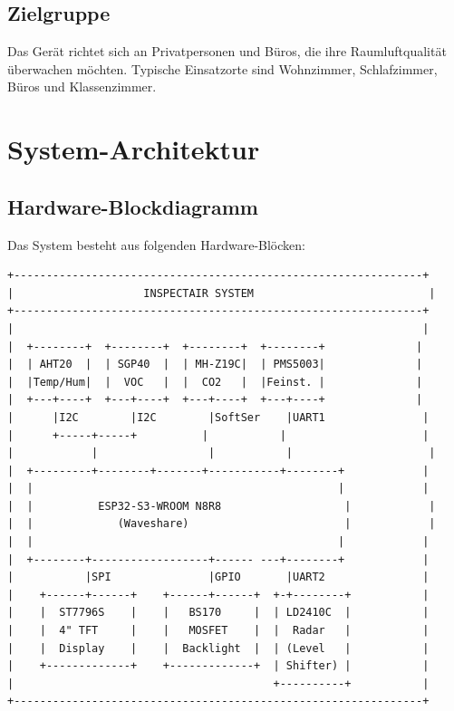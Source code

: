 \documentclass[a4paper,11pt]{article}
\begin{document}
\subsection{Zielgruppe}
Das Gerät richtet sich an Privatpersonen und Büros, die ihre Raumluftqualität überwachen möchten. Typische Einsatzorte sind Wohnzimmer, Schlafzimmer, Büros und Klassenzimmer.

\section{System-Architektur}

\subsection{Hardware-Blockdiagramm}

Das System besteht aus folgenden Hardware-Blöcken:

\begin{lstlisting}[language={},basicstyle=\ttfamily\footnotesize]
+---------------------------------------------------------------+
|                    INSPECTAIR SYSTEM                           |
+---------------------------------------------------------------+
|                                                               |
|  +--------+  +--------+  +--------+  +--------+              |
|  | AHT20  |  | SGP40  |  | MH-Z19C|  | PMS5003|              |
|  |Temp/Hum|  |  VOC   |  |  CO2   |  |Feinst. |              |
|  +---+----+  +---+----+  +---+----+  +---+----+              |
|      |I2C        |I2C        |SoftSer    |UART1               |
|      +-----+-----+          |           |                     |
|            |                 |           |                     |
|  +---------+--------+-------+-----------+--------+            |
|  |                                               |            |
|  |          ESP32-S3-WROOM N8R8                   |            |
|  |             (Waveshare)                        |            |
|  |                                               |            |
|  +--------+------------------+------ ---+--------+            |
|           |SPI               |GPIO       |UART2               |
|    +------+------+    +------+------+  +-+--------+           |
|    |  ST7796S    |    |   BS170     |  | LD2410C  |           |
|    |  4" TFT     |    |   MOSFET    |  |  Radar   |           |
|    |  Display    |    |  Backlight  |  | (Level   |           |
|    +-------------+    +-------------+  | Shifter) |           |
|                                        +----------+           |
+---------------------------------------------------------------+
\end{lstlisting}
\end{document}

